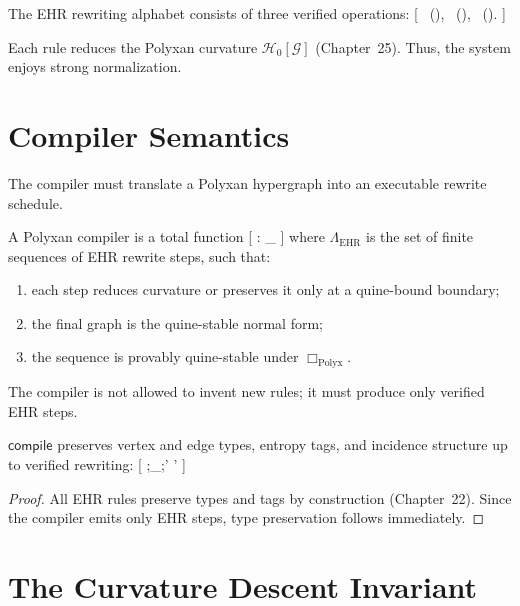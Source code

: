The EHR rewriting alphabet consists of three verified operations:
[
 \ (), \qquad
{} \ (), \qquad
{} \ ().
]

Each rule reduces the Polyxan curvature $\mathcal{H}_0[\mathcal{G}]$ (Chapter~25).
Thus, the system enjoys strong normalization.

\section{Compiler Semantics}

The compiler must translate a Polyxan hypergraph into an executable rewrite schedule.

\begin{definition}
A Polyxan compiler is a total function
[
 :  \to \Lambda_{}
]
where $\Lambda_{\mathrm{EHR}}$ is the set of finite sequences of EHR rewrite steps, such that:
\begin{enumerate}
\item each step reduces curvature or preserves it only at a quine-bound boundary;
\item the final graph is the quine-stable normal form;
\item the sequence is provably quine-stable under $\Box_{\mathrm{Polyx}}$.
\end{enumerate}
\end{definition}

The compiler is not allowed to invent new rules; it must produce only verified EHR steps.

\begin{proposition}
$\mathsf{compile}$ preserves vertex and edge types, entropy tags, and incidence structure up to verified rewriting:
[
;\leadsto_{};'
\quad\Longrightarrow\quad
{}'\simeq {} 
]
\end{proposition}

\begin{proof}
All EHR rules preserve types and tags by construction (Chapter~22).
Since the compiler emits only EHR steps, type preservation follows immediately.
\end{proof}

\section{The Curvature Descent Invariant}


